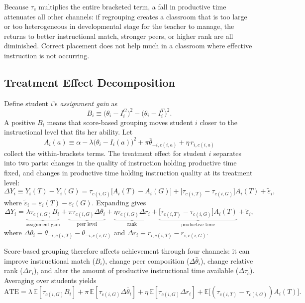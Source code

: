\documentclass[11pt]{article}
\newcommand{\E}{\mathbb{E}}
\begin{document}
Because $\tau_c$ multiplies the entire bracketed term, a fall in productive time attenuates all other channels: if regrouping creates a classroom that is too large or too heterogeneous in developmental stage for the teacher to manage, the returns to better instructional match, stronger peers, or higher rank are all diminished. Correct placement does not help much in a classroom where effective instruction is not occurring.

\subsection{Treatment Effect Decomposition}

Define student $i$'s \emph{assignment gain} as
\begin{equation}
\label{eq:Bi}
B_i \equiv \big(\theta_i - I_i^G\big)^2 - \big(\theta_i - I_i^T\big)^2.
\end{equation}
A positive $B_i$ means that score-based grouping moves student $i$ closer to the instructional level that fits her ability. Let
\begin{equation}
A_i(a) \equiv \alpha - \lambda\big(\theta_i - I_i(a)\big)^2 + \pi\bar{\theta}_{-i,c(i,a)} + \eta\, r_{i,c(i,a)}
\end{equation}
collect the within-brackets terms. The treatment effect for student $i$ separates into two parts: changes in the quality of instruction holding productive time fixed, and changes in productive time holding instruction quality at its treatment level:
\begin{equation}
\label{eq:decomp}
\Delta Y_i \equiv Y_i(T) - Y_i(G) = \tau_{c(i,G)}\big[A_i(T) - A_i(G)\big] + \big[\tau_{c(i,T)} - \tau_{c(i,G)}\big] A_i(T) + \tilde{\varepsilon}_i,
\end{equation}
where $\tilde{\varepsilon}_i = \varepsilon_i(T) - \varepsilon_i(G)$. Expanding gives
\begin{equation}
\label{eq:decomp_full}
\Delta Y_i = \underbrace{\lambda\tau_{c(i,G)} B_i}_{\text{assignment gain}} + \underbrace{\pi\tau_{c(i,G)}\Delta\bar{\theta}_i}_{\text{peer level}} + \underbrace{\eta\tau_{c(i,G)}\Delta r_i}_{\text{rank}} + \underbrace{\big[\tau_{c(i,T)} - \tau_{c(i,G)}\big] A_i(T)}_{\text{productive time}} + \tilde{\varepsilon}_i,
\end{equation}
where $\Delta\bar{\theta}_i \equiv \bar{\theta}_{-i,c(i,T)} - \bar{\theta}_{-i,c(i,G)}$ and $\Delta r_i \equiv r_{i,c(i,T)} - r_{i,c(i,G)}$.

Score-based grouping therefore affects achievement through four channels: it can improve instructional match ($B_i$), change peer composition ($\Delta\bar{\theta}_i$), change relative rank ($\Delta r_i$), and alter the amount of productive instructional time available ($\Delta\tau_c$). Averaging over students yields
\begin{equation}
\label{eq:ate}
\text{ATE} = \lambda\,\E[\tau_{c(i,G)} B_i] + \pi\,\E[\tau_{c(i,G)}\Delta\bar{\theta}_i] + \eta\,\E[\tau_{c(i,G)}\Delta r_i] + \E\!\big[(\tau_{c(i,T)} - \tau_{c(i,G)})A_i(T)\big].
\end{equation}
\end{document}
